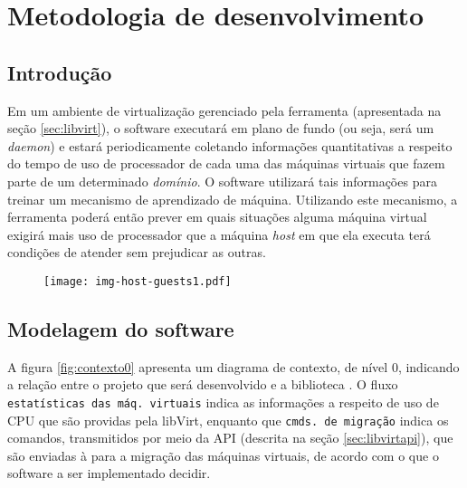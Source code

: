 %
%
%
% 
%
%

\chapter{Metodologia de desenvolvimento}\label{sec:meto}

\section{Introdução}

Em um ambiente de virtualização gerenciado pela ferramenta \libvirt
(apresentada na seção \ref{sec:libvirt}), o software executará em plano de
fundo (ou seja, será um \emph{daemon}) e estará periodicamente coletando
informações quantitativas a respeito do tempo de uso de processador de
cada uma das máquinas virtuais que fazem parte de um determinado
\emph{domínio}. O software utilizará tais informações para treinar um
mecanismo de aprendizado de máquina. Utilizando este mecanismo, a
ferramenta poderá então prever em quais situações alguma máquina virtual
exigirá mais uso de processador que a máquina \emph{host} em que ela
executa terá condições de atender sem prejudicar as outras.

\begin{figure}
\centering
\texttt{[image: img-host-guests1.pdf]}
\label{fig:hostguests1}
\end{figure}


\section{Modelagem do software}

A figura \ref{fig:contexto0} apresenta um diagrama de contexto, de nível 0,
indicando a relação entre o projeto que será desenvolvido e a biblioteca
\libvirt. O fluxo \texttt{estatísticas das máq. virtuais} indica as
informações a respeito de uso de CPU que são providas pela libVirt,
enquanto que \texttt{cmds. de migração} indica os comandos, transmitidos
por meio da API (descrita na seção \ref{sec:libvirtapi}), que são enviadas
à \libvirt{} para a migração das máquinas virtuais, de acordo com o que o
software a ser implementado decidir.


